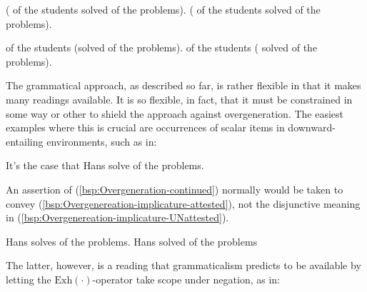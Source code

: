 \documentclass[fleqn,reqno,10pt,draft]{article}
\newcommand{\exh}{\ensuremath{\mathrm{Exh}}}
\begin{document}
\begin{exe}
  \ex \label{Grammar-Global}
    \begin{xlist}
      \ex \label{Grammar-Global-AE} \mymark{$\exh$}( of the students solved
         of the problems).
      \ex \label{Grammar-Global-GE} \mymark{$\exh$}( of the students solved
         of the problems).
    \end{xlist}
\end{exe}

\begin{exe}
  \ex \label{Grammar-Local}
    \begin{xlist}
      \ex \label{Grammar-Local-AE}  of the students \mymark{$\exh$}(solved
         of the problems).
      \ex \label{Grammar-Local-GE}  of the
        students \mymark{$\exh$}( solved
         of the problems).
    \end{xlist}
\end{exe}

The grammatical approach, as described so far, is rather flexible in
that it makes many readings available. It is so flexible, in fact,
that it must be constrained in some way or other to shield the
approach against overgeneration. The easiest examples where this is
crucial are occurrences of scalar items in downward-entailing
environments, such as in:

\begin{exe}
\ex \label{bsp:Overgenereation-target} It's  the case that
  Hans solve  of the problems.
\end{exe}

\noindent An assertion of (\ref{bsp:Overgeneration-continued})
normally would be taken to convey
(\ref{bsp:Overgenereation-implicature-attested}), not the disjunctive
meaning in (\ref{bsp:Overgenereation-implicature-UNattested}).

\begin{exe}
\ex 
  \begin{xlist}
  \ex \label{bsp:Overgenereation-implicature-attested} Hans solves  of the problems.
  \ex \label{bsp:Overgenereation-implicature-UNattested} Hans solved
     of the problems 
  \end{xlist}
\end{exe}

\noindent The latter, however, is a reading that grammaticalism
predicts to be available by letting the $\exh(\cdot)$-operator take
scope under negation, as in:
\end{document}
